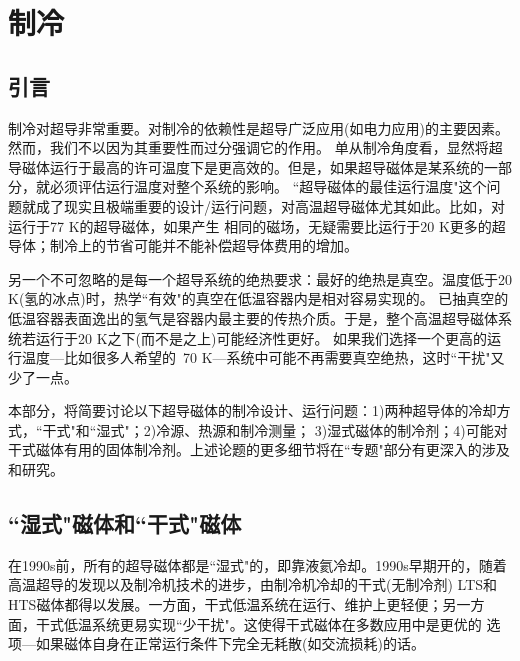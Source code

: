 \chapter{制冷}
\section{引言}
制冷对超导非常重要。对制冷的依赖性是超导广泛应用(如电力应用)的主要因素。然而，我们不以因为其重要性而过分强调它的作用。
单从制冷角度看，显然将超导磁体运行于最高的许可温度下是更高效的。但是，如果超导磁体是某系统的一部分，就必须评估运行温度对整个系统的影响。
``超导磁体的最佳运行温度"这个问题就成了现实且极端重要的设计/运行问题，对高温超导磁体尤其如此。比如，对运行于77 K的超导磁体，如果产生
相同的磁场，无疑需要比运行于20 K更多的超导体；制冷上的节省可能并不能补偿超导体费用的增加。

另一个不可忽略的是每一个超导系统的绝热要求：最好的绝热是真空。温度低于20 K(氢的冰点)时，热学``有效"的真空在低温容器内是相对容易实现的。
已抽真空的低温容器表面逸出的氢气是容器内最主要的传热介质。于是，整个高温超导磁体系统若运行于20 K之下(而不是之上)可能经济性更好。
如果我们选择一个更高的运行温度---比如很多人希望的~70 K---系统中可能不再需要真空绝热，这时``干扰"又少了一点。

本部分，将简要讨论以下超导磁体的制冷设计、运行问题：1)两种超导体的冷却方式，``干式"和``湿式"；2)冷源、热源和制冷测量；
3)湿式磁体的制冷剂；4)可能对干式磁体有用的固体制冷剂。上述论题的更多细节将在``专题"部分有更深入的涉及和研究。

\section{``湿式"磁体和``干式"磁体}
在1990s前，所有的超导磁体都是``湿式"的，即靠液氦冷却。1990s早期开的，随着高温超导的发现以及制冷机技术的进步，由制冷机冷却的干式(无制冷剂)
LTS和HTS磁体都得以发展。一方面，干式低温系统在运行、维护上更轻便；另一方面，干式低温系统更易实现``少干扰"。这使得干式磁体在多数应用中是更优的
选项---如果磁体自身在正常运行条件下完全无耗散(如交流损耗)的话。

